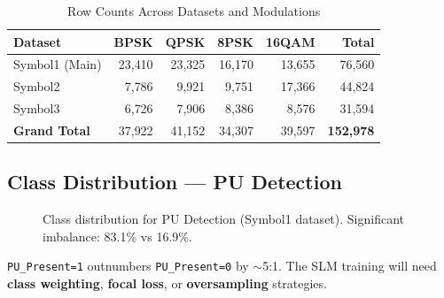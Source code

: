 \documentclass[12pt, a4paper]{article}
\begin{document}
\begin{table}[H]
\centering
\caption{Row Counts Across Datasets and Modulations}
\label{tab:rowcounts}
\begin{tabular}{@{}lrrrrr@{}}
\toprule
\textbf{Dataset}          & \textbf{BPSK}  & \textbf{QPSK}  & \textbf{8PSK}  & \textbf{16QAM} & \textbf{Total} \\
\midrule
Symbol1 (Main)            & 23{,}410       & 23{,}325       & 16{,}170       & 13{,}655       & 76{,}560 \\
Symbol2                   & 7{,}786        & 9{,}921        & 9{,}751        & 17{,}366       & 44{,}824 \\
Symbol3                   & 6{,}726        & 7{,}906        & 8{,}386        & 8{,}576        & 31{,}594 \\
\midrule
\textbf{Grand Total}      & 37{,}922       & 41{,}152       & 34{,}307       & 39{,}597       & \textbf{152{,}978} \\
\bottomrule
\end{tabular}
\end{table}


\subsection{Class Distribution — PU Detection}

\begin{figure}[H]
\centering
{}
\caption{Class distribution for PU Detection (Symbol1 dataset). Significant imbalance: 83.1\% vs 16.9\%.}
\label{fig:class_dist}
\end{figure}

\begin{warnbox}
\texttt{PU\_Present=1} outnumbers \texttt{PU\_Present=0} by $\sim$5:1. The SLM training will need \textbf{class weighting}, \textbf{focal loss}, or \textbf{oversampling} strategies.
\end{warnbox}
\end{document}
